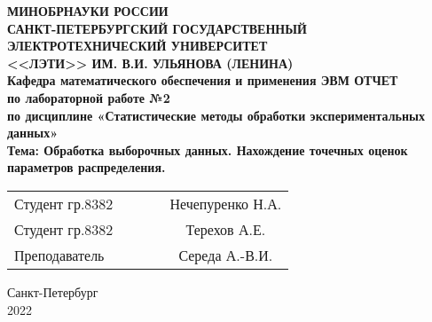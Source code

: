 \begin{titlepage}

\begin{center}
\textbf{
МИНОБРНАУКИ РОССИИ \\
САНКТ-ПЕТЕРБУРГСКИЙ ГОСУДАРСТВЕННЫЙ \\
ЭЛЕКТРОТЕХНИЧЕСКИЙ УНИВЕРСИТЕТ \\
<<ЛЭТИ>> ИМ. В.И. УЛЬЯНОВА (ЛЕНИНА) \\
Кафедра математического обеспечения и применения ЭВМ
\vfill
ОТЧЕТ\\
по лабораторной работе №2\\
по дисциплине «Статистические методы обработки экспериментальных данных»\\
Тема: Обработка выборочных данных. Нахождение точечных оценок параметров распределения.
\vfill
}
\begin{tabular}{ l c c c c }
 Студент гр.8382 & \hspace{2cm} & \underline{\hspace{4cm}} & \hspace{1cm} & Нечепуренко Н.А. \\
 Студент гр.8382 & \hspace{2cm} & \underline{\hspace{4cm}} & \hspace{1cm} & Терехов А.Е. \\
 Преподаватель & \hspace{2cm} & \underline{\hspace{4cm}} & \hspace{1cm} & Середа А.-В.И.
\end{tabular}

\vspace{3cm}

Санкт-Петербург\\
2022
\end{center}

\end{titlepage}
